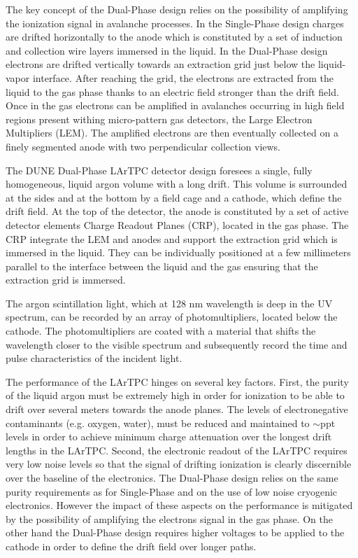 The key concept of the Dual-Phase design relies on the possibility of amplifying the ionization signal in avalanche processes. In the Single-Phase design charges are drifted horizontally to the anode which is constituted by a set of induction and collection wire layers immersed in the liquid. In the Dual-Phase design electrons are drifted vertically towards an extraction grid just below the liquid-vapor interface. After reaching the grid, the electrons are extracted from the liquid to the gas phase thanks to an electric field stronger than the drift field. Once in the gas electrons can be amplified in avalanches occurring in high field regions present withing micro-pattern gas detectors, the Large Electron Multipliers (LEM). The amplified electrons are then eventually collected on a finely segmented anode with two perpendicular collection views. 

The DUNE Dual-Phase LArTPC detector design foresees a single, fully homogeneous, liquid argon volume with a long drift. This volume is surrounded at the sides and at the bottom by a field cage and a cathode, which define the drift field. At the top of the detector, the anode is constituted by a set of active detector elements Charge Readout Planes (CRP), located in the gas phase. The CRP integrate the LEM and anodes and support the extraction grid which is immersed in the liquid. They can be individually positioned at a few millimeters parallel to the interface between the liquid and the gas ensuring that the extraction grid is immersed.

The argon scintillation light, which at 128 nm wavelength is deep in the UV spectrum, can be recorded by an array of photomultipliers, located below the cathode. The photomultipliers are coated with a material that shifts the wavelength closer to the visible spectrum and subsequently record the time and
pulse characteristics of the incident light.

The performance of the  LArTPC hinges on several key factors.  First, the purity of the liquid argon must be extremely high in order for ionization to
be able to drift over several meters towards the anode planes.  The levels of electronegative contaminants (e.g. oxygen, water), must be reduced and
maintained to $\sim$ppt levels in order to achieve minimum charge attenuation over the longest drift lengths in the LArTPC.   Second, the electronic readout
of the LArTPC requires very low noise levels so that the signal of drifting ionization is clearly discernible over the baseline of the electronics.  The Dual-Phase design relies on the same purity requirements as for Single-Phase and on the use of low noise cryogenic electronics. However the impact of these aspects on the performance is mitigated by the possibility of amplifying the electrons signal in the gas phase. On the other hand the Dual-Phase design requires higher voltages to be applied to the cathode in order to define the drift field over longer paths.

